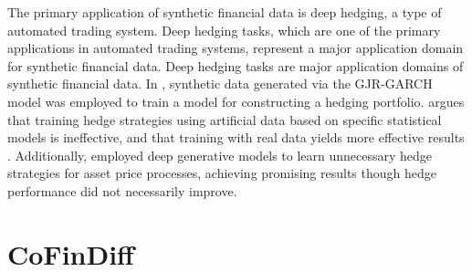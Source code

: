 \documentclass{article}
\begin{document}
The primary application of synthetic financial data is deep hedging, a type of automated trading system.
Deep hedging tasks, which are one of the primary applications in automated trading systems, represent a major application domain for synthetic financial data.
Deep hedging tasks are major application domains of synthetic financial data.
In \cite{deep_hedging}, synthetic data generated via the GJR-GARCH model was employed to train a model for constructing a hedging portfolio. 
\cite{mikkila2023empirical} argues that training hedge strategies using artificial data based on specific statistical models is ineffective, and that training with real data yields more effective results \cite{mikkila2023empirical}. Additionally, \cite{hirano2023adversarial} employed deep generative models to learn unnecessary hedge strategies for asset price processes, achieving promising results though hedge performance did not necessarily improve.


\section{CoFinDiff}
\end{document}
